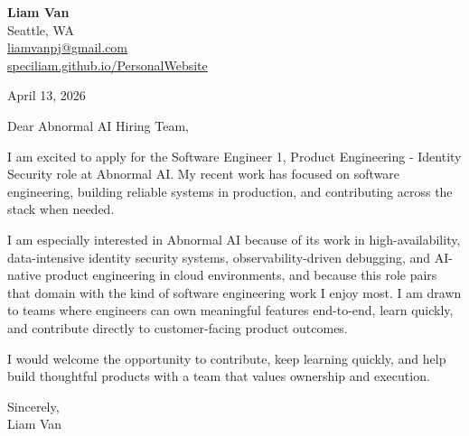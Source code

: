 \documentclass[letterpaper,11pt]{article}
\begin{document}
\begin{flushleft}
\textbf{\Large Liam Van} \\
Seattle, WA \\
\href{mailto:liamvanpj@gmail.com}{liamvanpj@gmail.com} \\
\href{https://speciliam.github.io/PersonalWebsite}{speciliam.github.io/PersonalWebsite}
\end{flushleft}

April 13, 2026

\noindent Dear Abnormal AI Hiring Team,

\noindent I am excited to apply for the Software Engineer 1, Product Engineering - Identity Security role at Abnormal AI. My recent work has focused on software engineering, building reliable systems in production, and contributing across the stack when needed.

\noindent I am especially interested in Abnormal AI because of its work in high-availability, data-intensive identity security systems, observability-driven debugging, and AI-native product engineering in cloud environments, and because this role pairs that domain with the kind of software engineering work I enjoy most. I am drawn to teams where engineers can own meaningful features end-to-end, learn quickly, and contribute directly to customer-facing product outcomes.

\noindent I would welcome the opportunity to contribute, keep learning quickly, and help build thoughtful products with a team that values ownership and execution.

\noindent Sincerely, \\
Liam Van
\end{document}
